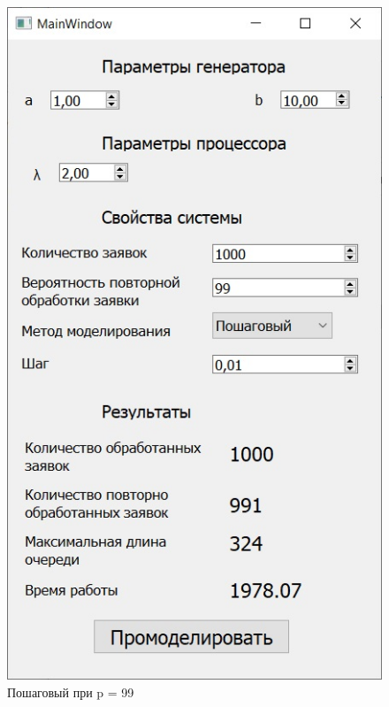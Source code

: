\documentclass[14pt, a4paper]{extarticle}
\begin{document}
\begin{figure}[h!]
	\centering
	\includegraphics[scale=0.6]{source/step99.jpg}
	\caption{Пошаговый при p = 99}
\end{figure}
\end{document}
